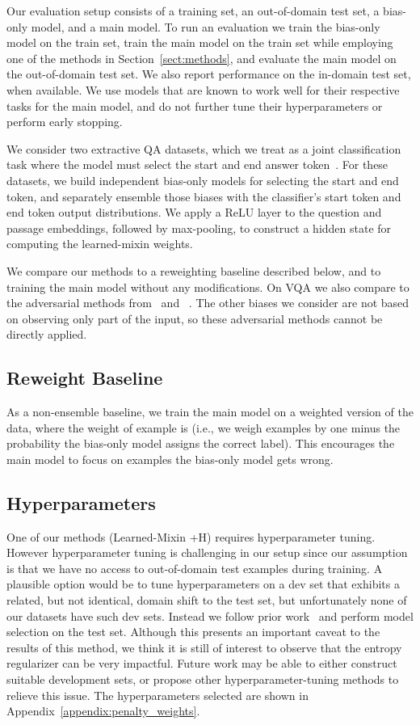 \documentclass[11pt,a4paper]{article}
\begin{document}
Our evaluation setup consists of a training set, an out-of-domain test set, a bias-only model, and a main model. To run an evaluation we train the bias-only model on the train set, train the main model on the train set while employing one of the methods in Section~\ref{sect:methods}, and evaluate the main model on the out-of-domain test set. We also report performance on the in-domain test set, when available. 
We use models that are known to work well for their respective tasks for the main model, and do not further tune their hyperparameters or perform early stopping.

We consider two extractive QA datasets, which we treat as a joint classification task where the model must select the start and end answer token~\cite{wang2016machine}. 
For these datasets, we build independent bias-only models for selecting the start and end token, and separately ensemble those biases with the classifier's start token and end token output distributions.  
We apply a ReLU layer to the question and passage embeddings, followed by max-pooling, to construct a hidden state for computing the learned-mixin weights.

We compare our methods to a reweighting baseline described below, and to training the main model without any modifications. On VQA we also compare to the adversarial methods from~\citet{ramakrishnan2018overcoming} and ~\citet{grand2019adversarial}. The other biases we consider are not based on observing only part of the input, so these adversarial methods cannot be directly applied.

\subsection{Reweight Baseline}
As a non-ensemble baseline, we train the main model on a weighted version of the data, where the weight of example  is  (i.e., we weigh examples by one minus the probability the bias-only model assigns the correct label). 
This encourages the main model to focus on examples the bias-only model gets wrong.
    
\subsection{Hyperparameters}
One of our methods (Learned-Mixin +H) requires hyperparameter tuning. However hyperparameter tuning is challenging in our setup since our assumption is that we have no access to out-of-domain test examples during training. 
A plausible option would be to tune hyperparameters on a dev set that exhibits a related, but not identical, domain shift to the test set, but unfortunately none of our datasets have such dev sets. Instead we follow prior work~\cite{grand2019adversarial,ramakrishnan2018overcoming} and perform model selection on the test set. Although this presents an important caveat to the results of this method, we think it is still of interest to observe that the entropy regularizer can be very impactful. Future work may be able to either construct suitable development sets, or propose other hyperparameter-tuning methods to relieve this issue. The hyperparameters selected are shown in Appendix~\ref{appendix:penalty_weights}.
\end{document}
